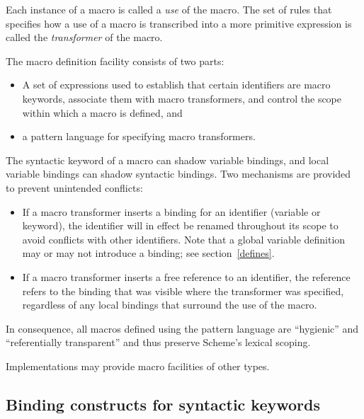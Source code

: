 Each instance of a macro is called a {\em use}
of the macro.
The set of rules that specifies
how a use of a macro is transcribed into a more primitive expression
is called the {\em transformer}
of the macro.

The macro definition facility consists of two parts:

\begin{itemize}
\item A set of expressions used to establish that certain identifiers
are macro keywords, associate them with macro transformers, and control
the scope within which a macro is defined, and

\item a pattern language for specifying macro transformers.
\end{itemize}

The syntactic keyword of a macro can shadow variable bindings, and local
variable bindings can shadow syntactic bindings.    
Two mechanisms are provided to prevent unintended conflicts:

\begin{itemize}

\item If a macro transformer inserts a binding for an identifier
(variable or keyword), the identifier will in effect be renamed
throughout its scope to avoid conflicts with other identifiers.
Note that a global variable definition may or may not introduce a binding;
see section~\ref{defines}.

\item If a macro transformer inserts a free reference to an
identifier, the reference refers to the binding that was visible
where the transformer was specified, regardless of any local
bindings that surround the use of the macro.

\end{itemize}

In consequence, all macros
defined using the pattern language  are ``hygienic'' and ``referentially
transparent'' and thus preserve Scheme's lexical scoping.~\cite{Kohlbecker86,
hygienic,Bawden88,macrosthatwork,syntacticabstraction}

Implementations may provide macro facilities of other types.

\subsection{Binding constructs for syntactic keywords}
\label{bindsyntax}

